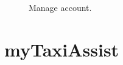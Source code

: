 \begin{figure}%
	\hfill%
	\hfill%
	\caption{Manage account.}\label{fig:manageAccount}
\end{figure}

\newpage

\section{myTaxiAssist}

\lipsum[1-2]
